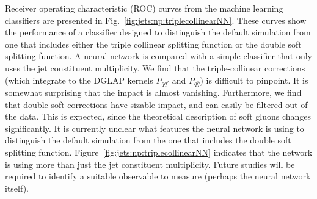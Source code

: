 Receiver operating characteristic (ROC) curves from the machine learning classifiers are presented in Fig.~\ref{fig:jets:np:triplecollinearNN}.  These curves show the performance of a classifier designed to distinguish the default simulation from one that includes either the triple collinear splitting function or the double soft splitting function.  A neural network is compared with a simple classifier that only uses the jet constituent multiplicity.  We find that the triple-collinear corrections (which integrate to
the DGLAP kernels $P_{qq'}$ and $P_{q\bar q}$) is difficult to pinpoint. 
It is somewhat surprising that the impact is almost vanishing.  Furthermore, we find that double-soft corrections have sizable impact, and can
easily be filtered out of the data. This is expected, since the theoretical
description of soft gluons changes significantly.  It is currently unclear what features the neural network is using to distinguish the default simulation from the one that includes the double soft splitting function.  Figure~\ref{fig:jets:np:triplecollinearNN} indicates that the network is using more than just the jet constituent multiplicity.  Future studies will be required to identify a suitable observable to measure (perhaps the neural network itself).  

